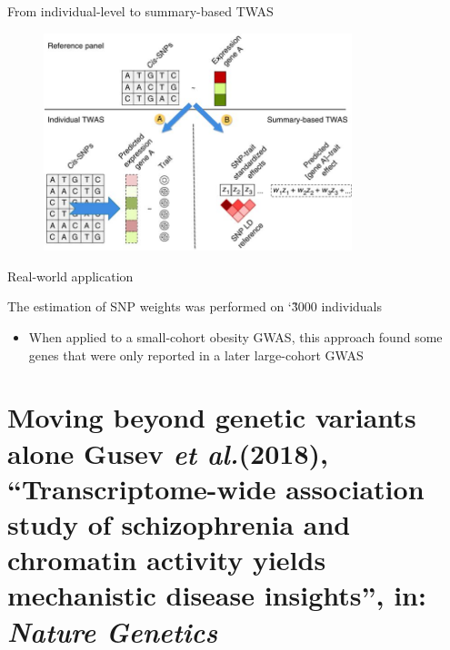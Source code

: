 \documentclass[aspectratio=169,12pt]{beamer}
\newcommand{\etal}{\textit{et al.}\xspace}
\begin{document}
\begin{frame}{From individual-level to summary-based TWAS}

	\begin{figure}
		\includegraphics[width=0.8\textwidth]{gusev2016/1-TWAS_schematic}
	\end{figure}


\end{frame}

\begin{frame}{Real-world application}

	The estimation of SNP weights was performed on \char`\~3000 
individuals

	\begin{itemize}
		\item When applied to a small-cohort obesity GWAS, this approach 
found some genes that were only reported in a later large-cohort GWAS
	\end{itemize}


\end{frame}

\section{Moving beyond genetic variants alone \newline
	\scriptsize Gusev \etal (2018), \enquote{Transcriptome-wide 
association study of schizophrenia and chromatin activity yields 
mechanistic disease insights}, in: \textit{Nature Genetics}}
\end{document}
